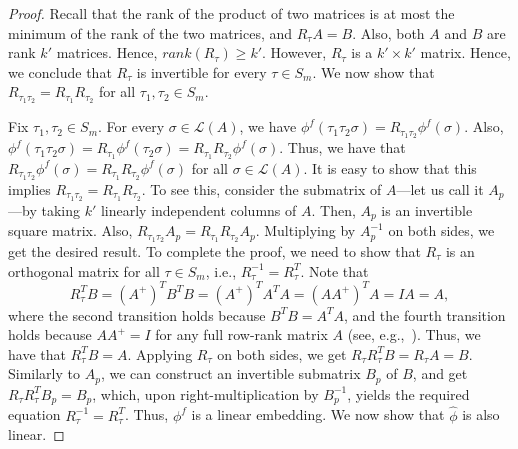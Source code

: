 \documentclass[prodmode]{acmsmall-ec14}
\newcommand{\calL}{{\mathcal{L}}}
\newcommand{\rank}{{\calL(A)}}
\begin{document}
\begin{proof}
Recall that the rank of the product of two matrices is at most the minimum of the rank of the two matrices, and $R_{\tau} A = B$. Also, both $A$ and $B$ are rank $k'$ matrices. Hence, $rank(R_{\tau}) \ge k'$. However, $R_{\tau}$ is a $k' \times k'$ matrix. Hence, we conclude that $R_{\tau}$ is invertible for every $\tau \in S_m$. We now show that $R_{\tau_1 \tau_2} = R_{\tau_1} R_{\tau_2}$ for all $\tau_1,\tau_2 \in S_m$. 

Fix $\tau_1,\tau_2 \in S_m$. For every $\sigma \in \rank$, we have $\phi^f(\tau_1 \tau_2 \sigma) = R_{\tau_1 \tau_2} \phi^f(\sigma)$. Also, $\phi^f(\tau_1 \tau_2 \sigma) = R_{\tau_1} \phi^f(\tau_2 \sigma) = R_{\tau_1}R_{\tau_2} \phi^f(\sigma)$. Thus, we have that $R_{\tau_1 \tau_2} \phi^f(\sigma) = R_{\tau_1} R_{\tau_2} \phi^f(\sigma)$ for all $\sigma \in \rank$. It is easy to show that this implies $R_{\tau_1 \tau_2} = R_{\tau_1} R_{\tau_2}$. To see this, consider the submatrix of $A$---let us call it $A_p$---by taking $k'$ linearly independent columns of $A$. Then, $A_p$ is an invertible square matrix. Also, $R_{\tau_1 \tau_2} A_p = R_{\tau_1} R_{\tau_2} A_p$. Multiplying by $A_p^{-1}$ on both sides, we get the desired result. To complete the proof, we need to show that $R_{\tau}$ is an orthogonal matrix for all $\tau \in S_m$, i.e., $R_{\tau}^{-1} = R_{\tau}^T$. Note that 
$$
R_{\tau}^T B = (A^{+})^T B^T B = (A^{+})^T A^T A = (A A^{+})^T A = I A = A,
$$
where the second transition holds because $B^T B = A^T A$, and the fourth transition holds because $A A^{+} = I$ for any full row-rank matrix $A$ (see, e.g.,~\cite{BH12}). Thus, we have that $R_{\tau}^T B = A$. Applying $R_{\tau}$ on both sides, we get $R_{\tau} R_{\tau}^T B = R_{\tau} A = B$. Similarly to $A_p$, we can construct an invertible submatrix $B_p$ of $B$, and get $R_{\tau} R_{\tau}^T B_p = B_p$, which, upon right-multiplication by $B_p^{-1}$, yields the required equation $R_{\tau}^{-1} = R_{\tau}^T$. Thus, $\phi^f$ is a linear embedding. We now show that $\hat{\phi}$ is also linear. 


\end{proof}
\end{document}
